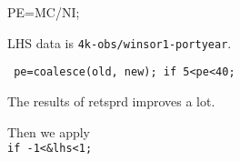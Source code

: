 

\usepackage[T1]{fontenc}




\thispagestyle{fancy}

\newcommand{\code}{\texttt}
\newcommand*{\Commonpath}{20190529}


PE=MC/NI;

LHS data is \code{4k-obs/winsor1-portyear}.

\code{
pe=coalesce(old, new);
if 5<pe<40;
}

The results of retsprd improves a lot.




Then we apply \\
\code{if -1<\&lhs<1;}






